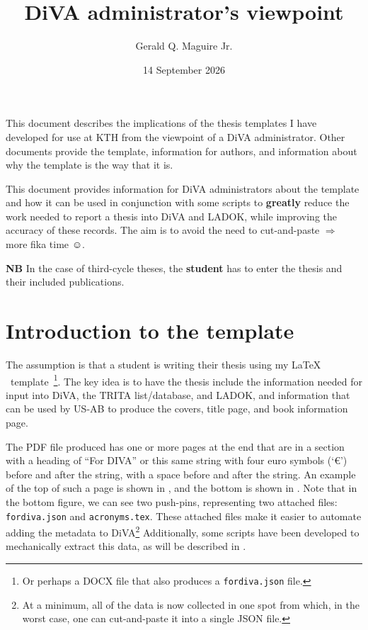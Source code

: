 \documentclass[12pt, twoside]{article}
\title{DiVA administrator's viewpoint}
\author{Gerald Q. Maguire Jr.}
\date{14 September 2026}
\newcommand{\fname}[1]{\texttt{#1}}
\begin{document}
\glsresetall
\maketitle
{}


This document describes the implications of the thesis templates I have developed for use at \gls{KTH} from the viewpoint of a \gls{DiVA} administrator. Other documents provide the template,  information for authors, and information about why the template is the way that it is.

This document provides information for \gls{DiVA} administrators about the template and how it can be used in conjunction with some scripts to \textbf{greatly} reduce the work needed to report a thesis into \gls{DiVA} and \gls{LADOK}, while improving the accuracy of these records. The aim is to avoid the need to cut-and-paste $\Rightarrow$ more fika time {\large $☺$}.

\textbf{NB} In the case of third-cycle theses, the \textbf{student} has to enter the thesis and their included publications.

\setcounter{page}{1}
\glsresetall
\section[Introduction to the template]{Introduction to the template}

The assumption is that a student is writing their thesis using my \LaTeX{} ~template~\cite{maguire2026kthtemplate}\footnote{Or perhaps a \gls{DOCX} file that also produces a \fname{fordiva.json} file.}.  The key idea is to have the thesis include  \first the information needed for input into \gls{DiVA}, the TRITA list/database, and \gls{LADOK}, and \Second information that can be used by US-AB to produce the covers, title page, and book information page.

The \gls{PDF} file produced has one or more pages at the end that are in a section with a heading of ``For DIVA'' or this same string with four euro symbols (\ie `€') before and after the string, with a space before and after the string. An example of the top of such a page is shown in , and the bottom is shown in . Note that in the bottom figure, we can see two push-pins, representing two attached files: \fname{fordiva.json} and \fname{acronyms.tex}. These attached files make it easier to automate adding the metadata to \gls{DiVA}\footnote{At a minimum, all of the data is now collected in one spot from which, in the worst case, one can cut-and-paste it into a single \gls{JSON} file.} Additionally, some scripts have been developed to mechanically extract this data, as will be described in .
\end{document}
